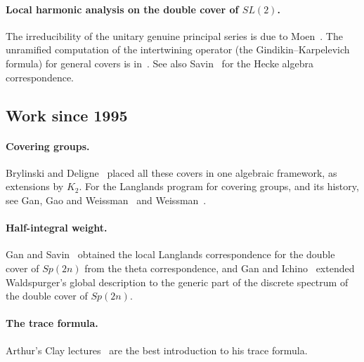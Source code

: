 \paragraph{Local harmonic analysis on the double cover of $SL(2)$.} The
irreducibility of the unitary genuine principal series is due to
Moen~\cite{Mo88}. The unramified computation of the intertwining
operator (the Gindikin--Karpelevich formula) for general covers is
in~\cite{KP84}. See also Savin~\cite{Sa88} for the Hecke algebra
correspondence.

\subsection*{Work since 1995}

\paragraph{Covering groups.} Brylinski and Deligne~\cite{BD01} placed all
these covers in one algebraic framework, as extensions by $K_2$. For the
Langlands program for covering groups, and its history, see Gan, Gao and
Weissman~\cite{GGW18} and Weissman~\cite{We18}.

\paragraph{Half-integral weight.} Gan and Savin~\cite{GS12}
obtained the local Langlands correspondence for the double cover of
$Sp(2n)$ from the theta correspondence, and Gan and Ichino~\cite{GI18}
extended Waldspurger's global description to the generic part of the
discrete spectrum of the double cover of $Sp(2n)$.

\paragraph{The trace formula.} Arthur's Clay lectures~\cite{Ar05} are the
best introduction to his trace formula.

